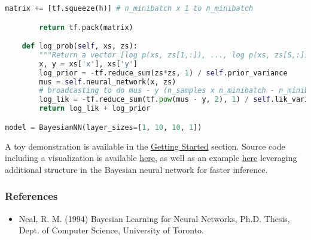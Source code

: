 \begin{lstlisting}[language=Python]
            matrix += [tf.squeeze(h)] # n_minibatch x 1 to n_minibatch

        return tf.pack(matrix)

    def log_prob(self, xs, zs):
        """Return a vector [log p(xs, zs[1,:]), ..., log p(xs, zs[S,:])]."""
        x, y = xs['x'], xs['y']
        log_prior = -tf.reduce_sum(zs*zs, 1) / self.prior_variance
        mus = self.neural_network(x, zs)
        # broadcasting to do mus - y (n_samples x n_minibatch - n_minibatch)
        log_lik = -tf.reduce_sum(tf.pow(mus - y, 2), 1) / self.lik_variance
        return log_lik + log_prior

model = BayesianNN(layer_sizes=[1, 10, 10, 1])
\end{lstlisting}

A toy demonstration is available in the \href{getting-started.html}{Getting Started} section.
Source code including a visualization is available
\href{https://github.com/blei-lab/edward/blob/master/examples/bayesian_nn.py}
{here}, as well as an example
\href{https://github.com/blei-lab/edward/blob/master/examples/bayesian_nn_analytic_kl.py}
{here}
leveraging additional structure in the
Bayesian neural network for faster inference.

\subsubsection{References}\label{references}

\begin{itemize}
\item
  Neal, R. M. (1994) Bayesian Learning for Neural Networks, Ph.D.
  Thesis, Dept. of Computer Science, University of Toronto.
\end{itemize}
